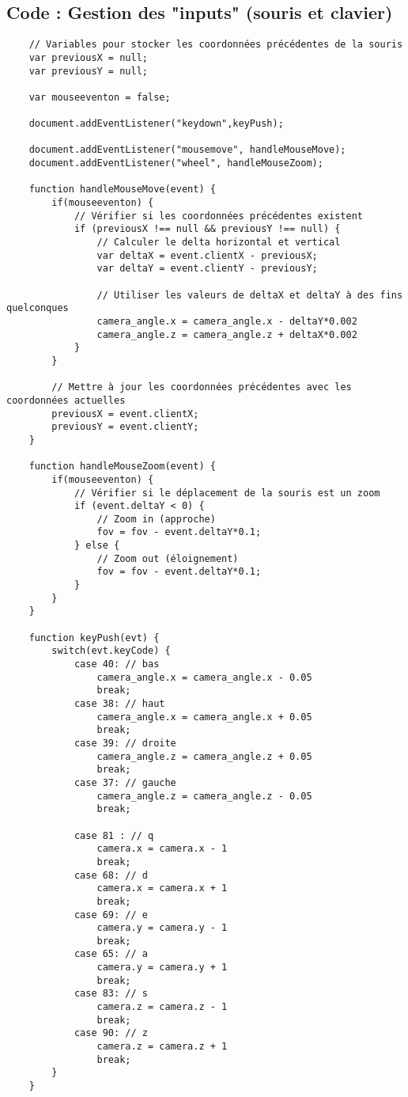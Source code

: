 \clearpage
\subsection{Code : Gestion des "inputs" (souris et clavier)}
\begin{verbatim}
    // Variables pour stocker les coordonnées précédentes de la souris
    var previousX = null;
    var previousY = null;
    
    var mouseeventon = false;
    
    document.addEventListener("keydown",keyPush);
    
    document.addEventListener("mousemove", handleMouseMove);
    document.addEventListener("wheel", handleMouseZoom);
    
    function handleMouseMove(event) {
        if(mouseeventon) {
            // Vérifier si les coordonnées précédentes existent
            if (previousX !== null && previousY !== null) {
                // Calculer le delta horizontal et vertical
                var deltaX = event.clientX - previousX;
                var deltaY = event.clientY - previousY;
        
                // Utiliser les valeurs de deltaX et deltaY à des fins quelconques
                camera_angle.x = camera_angle.x - deltaY*0.002
                camera_angle.z = camera_angle.z + deltaX*0.002
            }
        }
        
        // Mettre à jour les coordonnées précédentes avec les coordonnées actuelles
        previousX = event.clientX;
        previousY = event.clientY;
    }
    
    function handleMouseZoom(event) {
        if(mouseeventon) {
            // Vérifier si le déplacement de la souris est un zoom
            if (event.deltaY < 0) {
                // Zoom in (approche)
                fov = fov - event.deltaY*0.1;
            } else {
                // Zoom out (éloignement)
                fov = fov - event.deltaY*0.1;
            }
        }
    }
    
    function keyPush(evt) {
        switch(evt.keyCode) {
            case 40: // bas
            	camera_angle.x = camera_angle.x - 0.05
                break;
            case 38: // haut
            	camera_angle.x = camera_angle.x + 0.05
                break;
            case 39: // droite
            	camera_angle.z = camera_angle.z + 0.05
                break;
            case 37: // gauche
            	camera_angle.z = camera_angle.z - 0.05
                break;
    
            case 81 : // q
            	camera.x = camera.x - 1
                break;
            case 68: // d
            	camera.x = camera.x + 1
                break;
            case 69: // e
            	camera.y = camera.y - 1
                break;
            case 65: // a
            	camera.y = camera.y + 1
                break;
            case 83: // s
            	camera.z = camera.z - 1
                break;
            case 90: // z
            	camera.z = camera.z + 1
                break;
        }
    }
\end{verbatim}


